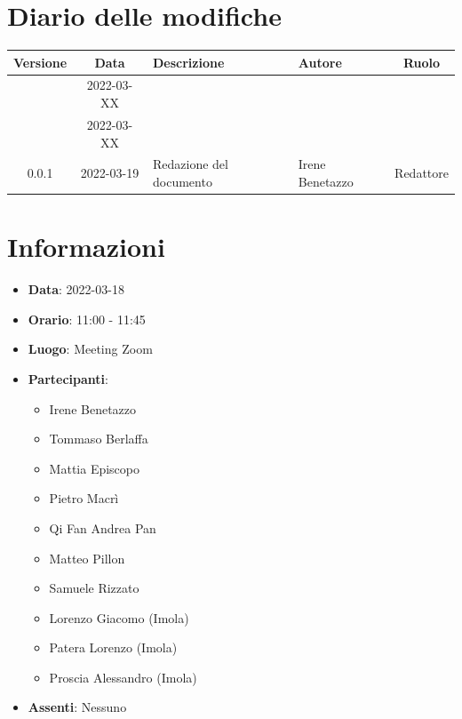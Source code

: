 \documentclass[12pt, a4paper,table]{article}
\begin{document}
	\section*{Diario delle modifiche}
	\begin{center}
	\renewcommand{\arraystretch}{1.8} %
	\begin{tabular}{ |c|c|m{14em}|m{7em}|c| }
	\hline
	\textbf{Versione} & \textbf{Data} & \textbf{Descrizione} &  \textbf{Autore} &  \textbf{Ruolo} \\
	\hline
    & 2022-03-XX & & & \\
	\hline
    & 2022-03-XX & & & \\
	\hline
	0.0.1 & 2022-03-19 & Redazione del documento & Irene \newline Benetazzo & Redattore\\
	\hline
	\end{tabular}
	\end{center}
	\newpage

	\tableofcontents
	\newpage

	\section{Informazioni}
	\begin{itemize}
		\item \textbf{Data}: 2022-03-18
		\item \textbf{Orario}: 11:00 - 11:45
		\item \textbf{Luogo}: Meeting Zoom
		\item \textbf{Partecipanti}:
		\begin{itemize}
			\item Irene Benetazzo
			\item Tommaso Berlaffa
			\item Mattia Episcopo
			\item Pietro Macrì
			\item Qi Fan Andrea Pan
			\item Matteo Pillon
			\item Samuele Rizzato
			\item Lorenzo Giacomo (Imola)
            \item Patera Lorenzo (Imola)
            \item Proscia Alessandro (Imola)            
		\end{itemize}
        \item \textbf{Assenti}: Nessuno
	\end{itemize}
\end{document}
